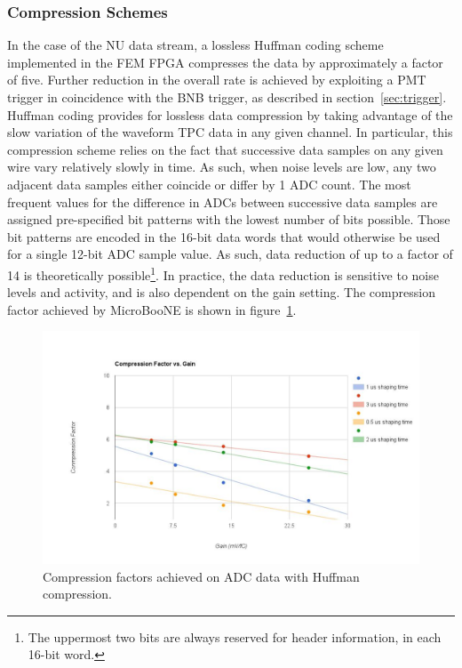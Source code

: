

\subsubsection{Compression Schemes}
\label{sec:tpccomp}

In the case of the NU data stream, a lossless Huffman coding scheme implemented in the FEM FPGA compresses the data by approximately a factor of five. Further reduction in the overall rate is achieved by exploiting a PMT trigger in coincidence with the BNB trigger, as described in section~\ref{sec:trigger}. Huffman coding provides for lossless data compression by taking advantage of the slow variation of the waveform TPC data in any given channel. In particular, this compression scheme relies on the fact that successive data samples on any given wire vary relatively slowly in time. As such, when noise levels are low, any two adjacent data samples either coincide or differ by 1 ADC count. The most frequent values for the difference in ADCs between successive data samples are assigned pre-specified bit patterns with the lowest number of bits possible. Those bit patterns are encoded in the 16-bit data words that would otherwise be used for a single 12-bit ADC sample value. As such, data reduction of up to a factor of 14 is theoretically possible\footnote{The uppermost two bits are always reserved for header information, in each 16-bit word.}. In practice, the data reduction is sensitive to noise levels and \lartpc activity, and is also dependent on the gain setting. The compression factor achieved by MicroBooNE is shown in figure~\ref{fig:readout_6}.

\begin{figure}
\centering
\includegraphics[width=0.8\linewidth]{./figures/readout_6.jpg}%
\caption{\label{fig:readout_6}Compression factors achieved on ADC data with Huffman compression.}
\end{figure}

